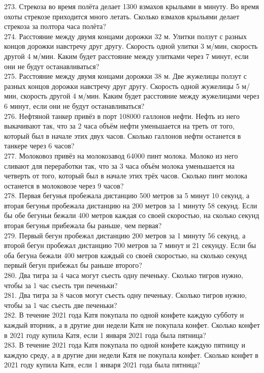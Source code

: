 \documentclass[12pt]{article}
\begin{document}
273. Стрекоза во время полёта делает 1300 взмахов крыльями в минуту. Во время охоты стрекозе приходится много летать. Сколько взмахов крыльями делает стрекоза за полтора часа полёта?\\
274. Расстояние между двумя концами дорожки 32 м. Улитки ползут с разных концов дорожки навстречу друг другу. Скорость одной улитки 3 м/мин, скорость другой 4 м/мин. Каким будет расстояние между улитками через 7 минут, если они не будут останавливаться?\\
275. Расстояние между двумя концами дорожки 38 м. Две жужелицы ползут с разных концов дорожки навстречу друг другу. Скорость одной жужелицы 5 м/мин, скорость другой 4 м/мин. Каким будет расстояние между жужелицами через 6 минут, если они не будут останавливаться?\\
276. Нефтяной танкер привёз в порт 108000 галлонов нефти. Нефть из него выкачивают так, что за 2 часа объём нефти уменьшается на треть от того, который был в начале этих двух часов. Сколько галлонов нефти останется в танкере через 6 часов?\\
277. Молоковоз привёз на молокозавод 64000 пинт молока. Молоко из него сливают для переработки так, что за 3 часа объём молока уменьшается на четверть от того, который был в начале этих трёх часов. Сколько пинт молока останется в молоковозе через 9 часов?\\
278. Первая бегунья пробежала дистанцию 500 метров за 5 минут 10 секунд, а вторая бегунья пробежала дистанцию на 200 метров за 1 минуту 58 секунд. Если бы обе бегуньи бежали 400 метров каждая со своей скоростью, на сколько секунд вторая бегунья прибежала бы раньше, чем первая?\\
279. Первый бегун пробежал дистанцию 200 метров за 1 минуту 56 секунд, а второй бегун пробежал дистанцию 700 метров за 7 минут и 21 секунду. Если бы оба бегуна бежали 400 метров каждый со своей скоростью, на сколько секунд первый бегун прибежал бы раньше второго?\\
280. Два тигра за 4 часа могут съесть одну печеньку. Сколько тигров нужно, чтобы за 1 час съесть три печеньки?\\
281. Два тигра за 8 часов могут съесть одну печеньку. Сколько тигров нужно, чтобы за 1 час съесть две печеньки?\\
282. В течение 2021 года Катя покупала по одной конфете каждую субботу и каждый вторник, а в другие дни недели Катя не покупала конфет. Сколько конфет в 2021 году купила Катя, если 1 января 2021 года была пятница?\\
283. В течение 2021 года Катя покупала по одной конфете каждую пятницу и каждую среду, а в другие дни недели Катя не покупала конфет. Сколько конфет в 2021 году купила Катя, если 1 января 2021 года была пятница?\\
\end{document}
